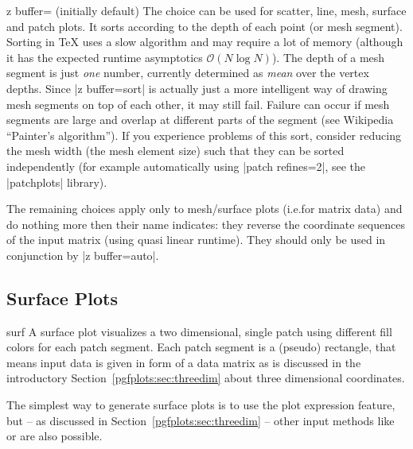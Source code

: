{\begin{pgfplotskey}{z buffer= (initially default)%
}
    The choice  can be used for scatter, line, mesh, surface
    and patch plots. It sorts according to the depth of each point (or mesh
    segment). Sorting in \TeX{} uses a slow algorithm and may require a lot of
    memory (although it has the expected runtime asymptotics $\mathcal O(N \log
    N)$). The depth of a mesh segment is just \emph{one} number, currently
    determined as \emph{mean} over the vertex depths. Since |z buffer=sort| is
    actually just a more intelligent way of drawing mesh segments on top of
    each other, it may still fail. Failure can occur if mesh segments are large
    and overlap at different parts of the segment (see Wikipedia ``Painter's
    algorithm''). If you experience problems of this sort, consider reducing
    the mesh width (the mesh element size) such that they can be sorted
    independently (for example automatically using |patch refines=2|, see the
    |patchplots| library).

    The remaining choices apply only to mesh/surface plots (i.e.\@ for matrix
    data) and do nothing more then their name indicates: they reverse the
    coordinate sequences of the input matrix (using quasi linear runtime). They
    should only be used in conjunction by |z buffer=auto|.
\end{pgfplotskey}


\subsection{Surface Plots}
\label{sec:pgfplots:surfplots}

\begin{plottype}[/pgfplots]{surf}
    A surface plot visualizes a two dimensional, single patch using different
    fill colors for each patch segment. Each patch segment is a (pseudo)
    rectangle, that means input data is given in form of a data matrix as is
    discussed in the introductory Section~\ref{pgfplots:sec:threedim} about
    three dimensional coordinates.

\pgfplotsexpensiveexample
\begin{codeexample}[]
\end{codeexample}

    The simplest way to generate surface plots is to use the plot expression
    feature, but -- as discussed in Section~\ref{pgfplots:sec:threedim} --
    other input methods like  or
     are also possible.


\end{plottype}}
